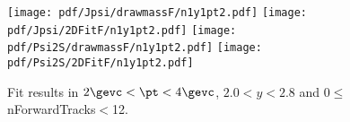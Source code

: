 \begin{figure}[H]
\begin{center}
\texttt{[image: pdf/Jpsi/drawmassF/n1y1pt2.pdf]}
\texttt{[image: pdf/Jpsi/2DFitF/n1y1pt2.pdf]}
\vspace*{-0.5cm}
\texttt{[image: pdf/Psi2S/drawmassF/n1y1pt2.pdf]}
\texttt{[image: pdf/Psi2S/2DFitF/n1y1pt2.pdf]}
\vspace*{-0.5cm}
\end{center}
\caption{Fit results in $2\gevc<\pt<4\gevc$, $2.0<y<2.8$ and 0$\leq$nForwardTracks$<$12.}
\label{Fitn1y1pt2}
\end{figure}
